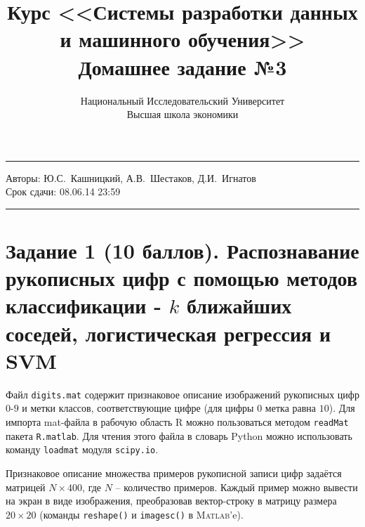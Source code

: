 \documentclass[a4paper,11pt]{article}
\title{\textbf{Курс <<Системы разработки данных и машинного обучения>>} \\
Домашнее задание №3}
\author{Национальный Исследовательский Университет
\\Высшая школа экономики}
\date{}
\begin{document}
\maketitle

\hrule
\noindent Авторы: Ю.С.~Кашницкий, А.В.~Шестаков, Д.И.~Игнатов \\
\hfill Срок сдачи: 08.06.14 23:59
\hrule


\section*{Задание 1 (10 баллов). Распознавание рукописных цифр с помощью методов классификации - $k$ ближайших соседей, логистическая регрессия и SVM}
Файл \verb"digits.mat" содержит признаковое описание изображений рукописных цифр $0$-$9$ и метки классов, соответствующие цифре (для цифры $0$ метка равна $10$). Для импорта mat-файла в рабочую область R можно пользоваться методом \verb"readMat" пакета \verb"R.matlab". Для чтения этого файла в словарь Python можно использовать команду \verb"loadmat" модуля \verb"scipy.io".

Признаковое описание множества примеров рукописной записи цифр задаётся матрицей $N \times 400$, где $N$ -- количество примеров. Каждый пример можно вывести на экран в виде изображения, преобразовав вектор-строку в матрицу размера $20\times20$ (команды \verb"reshape()"  и \verb"imagesc()" в \textsc{Matlab}'e).
\end{document}
